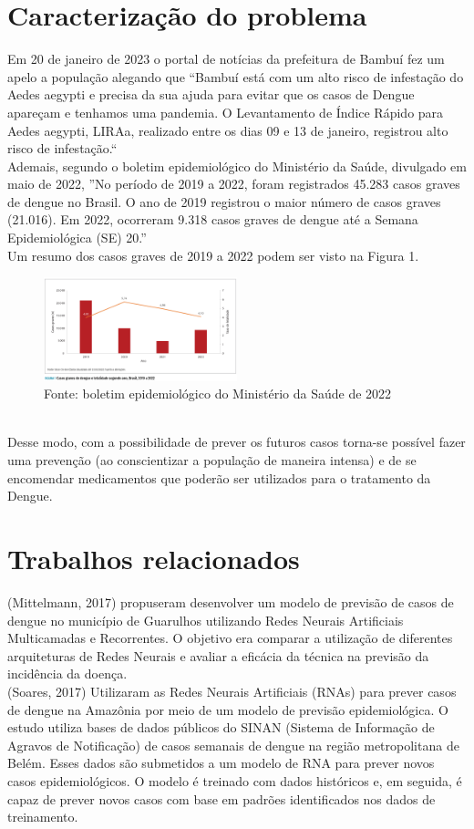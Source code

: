 \documentclass[
	article,			%
	11pt,				%
	a4paper,			%
	chapter=TITLE,		%
	section=TITLE,		%
	subsection=TITLE,	%
	subsubsection=TITLE %
	english,			%
	brazil,				%
	sumario=tradicional
	]{abntex2}
\begin{document}
\section{Caracterização do problema}
 Em 20 de janeiro de 2023 o portal de notícias da prefeitura de Bambuí fez um apelo a população alegando que 
“Bambuí está com um alto risco de infestação do Aedes aegypti e precisa da sua ajuda para evitar que os casos de Dengue apareçam e tenhamos uma pandemia.
 O Levantamento de Índice Rápido para Aedes aegypti, LIRAa, realizado entre os dias 09 e 13 de janeiro, registrou alto risco de infestação.“
 \\ \indent
 Ademais, segundo o boletim epidemiológico do Ministério da Saúde, divulgado em maio de 2022, 
 ”No período de 2019 a 2022, foram registrados 45.283 casos graves de dengue no
 Brasil. O ano de 2019 registrou o maior número de casos graves (21.016). Em 2022,
 ocorreram 9.318 casos graves de dengue até a Semana Epidemiológica (SE) 20.”
\\ \indent 
Um resumo dos casos graves de 2019 a 2022 podem ser visto na Figura 1.
\begin{figure}[htbp]
	\centering
	\includegraphics[width=0.5\textwidth]{imagens/graficoDengueMS.png}
	\caption{Fonte: boletim epidemiológico do Ministério da Saúde de 2022}
	\label{figure1}
\end{figure}
\\Desse modo, com a possibilidade de prever os futuros casos torna-se possível fazer uma prevenção (ao conscientizar a população de maneira intensa) e de se encomendar medicamentos que poderão ser utilizados para o tratamento da Dengue.
\section{Trabalhos  relacionados}
(Mittelmann, 2017) propuseram desenvolver um modelo de previsão de casos de dengue no município de Guarulhos utilizando Redes Neurais Artificiais Multicamadas e Recorrentes. O objetivo era comparar a utilização de diferentes arquiteturas de Redes Neurais e avaliar a eficácia da técnica na previsão da incidência da doença. 
\\ \indent
(Soares, 2017) Utilizaram as Redes Neurais Artificiais (RNAs) para prever casos de dengue na Amazônia por meio de um modelo de previsão epidemiológica. O estudo utiliza bases de dados públicos do SINAN (Sistema de Informação de Agravos de Notificação) de casos semanais de dengue na região metropolitana de Belém. Esses dados são submetidos a um modelo de RNA para prever novos casos epidemiológicos. O modelo é treinado com dados históricos e, em seguida, é capaz de prever novos casos com base em padrões identificados nos dados de treinamento. 
\end{document}
